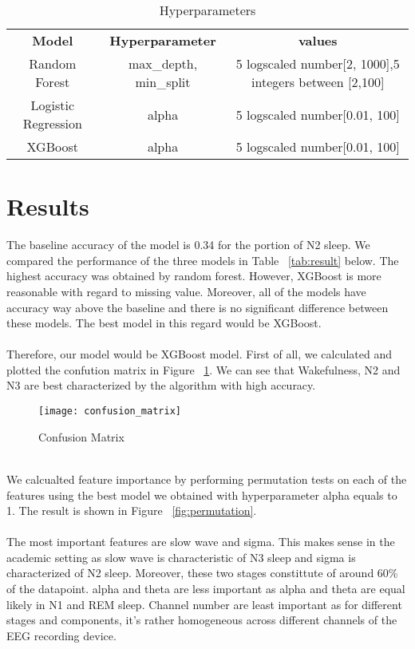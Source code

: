 \begin{table}[hb]
\centering
\caption{Hyperparameters} 
\begin{tabular}{ c c c }
 \textbf{Model} & \textbf{Hyperparameter} & \textbf{values} \\ 
 Random Forest & max\_depth, min\_split & 5 logscaled number[2, 1000],5 integers between [2,100] \\  
 Logistic Regression & alpha & 5 logscaled number[0.01, 100]\\
 XGBoost & alpha & 5 logscaled number[0.01, 100]
\end{tabular}
\label{tab:hyper} 
\end{table}

\section*{Results}
The baseline accuracy of the model is 0.34 for the portion of N2 sleep. We compared the performance of the three models in Table ~\ref{tab:result} below. The highest accuracy was obtained by random forest. However, XGBoost is more reasonable with regard to missing value. Moreover, all of the models have accuracy way above the baseline and there is no significant difference between these models. The best model in this regard would be XGBoost. \\
\\
Therefore, our model would be XGBoost model. First of all, we calculated and plotted the confution matrix in Figure ~\ref{fig:confusion}. We can see that Wakefulness, N2 and N3 are best characterized by the algorithm with high accuracy.\\
\begin{figure}[ht]
  \texttt{[image: confusion\_matrix]}
  \caption{Confusion Matrix}
  \label{fig:confusion}
\end{figure} 
\\
We calcualted feature importance by performing permutation tests on each of the features using the best model we obtained with hyperparameter alpha equals to 1. The result is shown in Figure ~\ref{fig:permutation}. \\
\\
The most important features are slow wave and sigma. This makes sense in the academic setting as slow wave is characteristic of N3 sleep and sigma is characterized of N2 sleep. Moreover, these two stages constittute of around 60\% of the datapoint. alpha and theta are less important as alpha and theta are equal likely in N1 and REM sleep. Channel number are least important as for different stages and components, it's rather homogeneous across different channels of the EEG recording device.\\  

